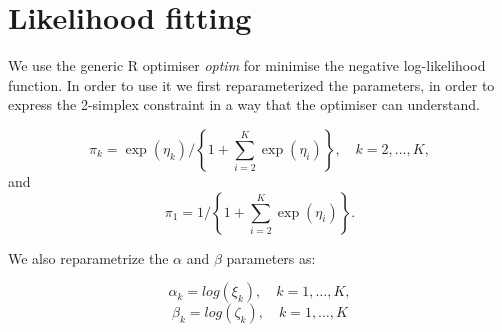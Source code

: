 \documentclass[10pt]{report}
\begin{document}
\section{Likelihood fitting}

We use the generic R optimiser \textit{optim} for minimise the negative log-likelihood function. In order to use it we first reparameterized the parameters, in order to express the 2-simplex constraint in a way that the optimiser can understand.

$$
\pi_k = \exp(\eta_k)/\left\{ 1+ \sum_{i=2}^K\exp(\eta_i)\right\}, \quad k=2,\ldots, K, 
$$
and 
$$
\pi_1 = 1/\left\{ 1+ \sum_{i=2}^K\exp(\eta_i)\right\}.
$$

We also reparametrize the $\alpha$ and $\beta$ parameters as:

$$
\alpha_k = log(\xi_k), \quad k=1,\ldots,K,
$$
$$
\beta_k = log(\zeta_k), \quad k=1,\ldots,K
$$
\end{document}
